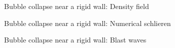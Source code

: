 \documentclass[10pt, aspectratio=169]{beamer}
\begin{document}
\begin{frame}{Bubble collapse near a rigid wall: Density field}
    \centering
\end{frame}

\begin{frame}{Bubble collapse near a rigid wall: Numerical schlieren}
    \centering
\end{frame}

\begin{frame}{Bubble collapse near a rigid wall: Blast waves}
    \centering
\end{frame}
\end{document}
